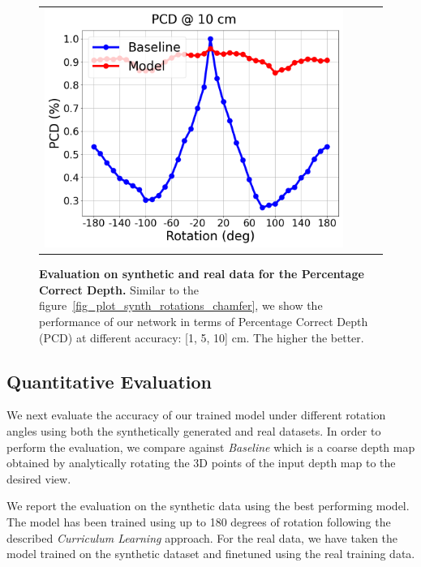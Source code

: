\begin{figure}
\begin{tabular}{cccc}
    \includegraphics[scale=0.13]{main/chapter04/data/plot_pcd_10_real}\\
    \end{tabular}
    \caption[Evaluation on synthetic and real data for the Percentage Correct Depth]{{\bf Evaluation on synthetic and real data for the Percentage Correct Depth.} Similar to the figure~\ref{fig_plot_synth_rotations_chamfer}, we show the performance of our network in terms of Percentage Correct Depth (PCD) at different accuracy: [1, 5, 10] cm. The higher the better.}
    \label{fig_plot_synth_rotations_pcd}
\end{figure}

\subsection{Quantitative Evaluation}

We next evaluate the accuracy of our trained model under different rotation angles using both the  synthetically generated and real datasets. In order to perform the evaluation, we compare against {\em Baseline} which is  a coarse depth map obtained by analytically rotating the 3D points of the input depth map to the desired view.

We report the evaluation on the synthetic data using the best performing model. The model has been trained using up to  180 degrees of rotation following the described \textit{Curriculum Learning} approach. For the real data, we have taken the model trained on the synthetic dataset and finetuned using the real training data.

